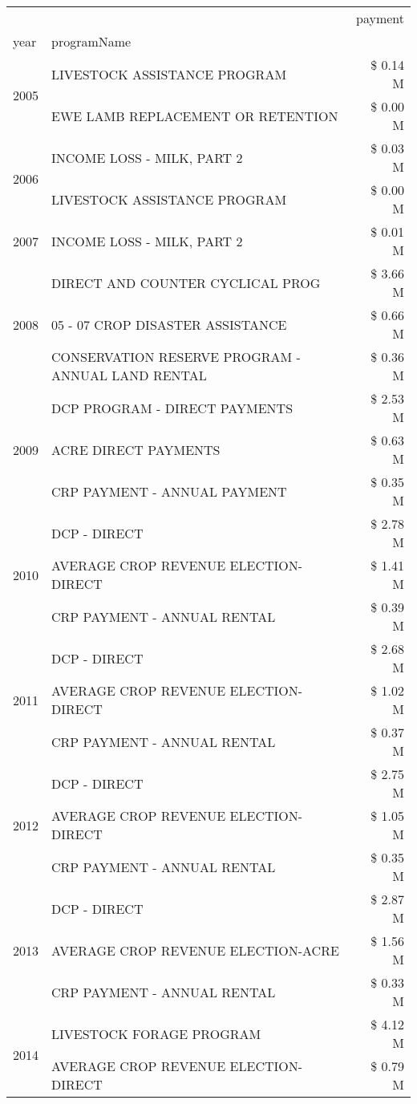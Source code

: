 \begin{tabular}{llr}
\toprule
 &  & payment \\
year & programName &  \\
\midrule
\multirow[t]{2}{*}{2005} & LIVESTOCK ASSISTANCE PROGRAM & \$ 0.14 M \\
 & EWE LAMB REPLACEMENT OR RETENTION & \$ 0.00 M \\
\cline{1-3}
\multirow[t]{2}{*}{2006} & INCOME LOSS - MILK, PART 2 & \$ 0.03 M \\
 & LIVESTOCK ASSISTANCE PROGRAM & \$ 0.00 M \\
\cline{1-3}
2007 & INCOME LOSS - MILK, PART 2 & \$ 0.01 M \\
\cline{1-3}
\multirow[t]{3}{*}{2008} & DIRECT AND COUNTER CYCLICAL PROG & \$ 3.66 M \\
 & 05 - 07 CROP DISASTER ASSISTANCE & \$ 0.66 M \\
 & CONSERVATION RESERVE PROGRAM - ANNUAL LAND RENTAL & \$ 0.36 M \\
\cline{1-3}
\multirow[t]{3}{*}{2009} & DCP PROGRAM - DIRECT PAYMENTS & \$ 2.53 M \\
 & ACRE DIRECT PAYMENTS & \$ 0.63 M \\
 & CRP PAYMENT - ANNUAL PAYMENT & \$ 0.35 M \\
\cline{1-3}
\multirow[t]{3}{*}{2010} & DCP - DIRECT & \$ 2.78 M \\
 & AVERAGE CROP REVENUE ELECTION-DIRECT & \$ 1.41 M \\
 & CRP PAYMENT - ANNUAL RENTAL & \$ 0.39 M \\
\cline{1-3}
\multirow[t]{3}{*}{2011} & DCP - DIRECT & \$ 2.68 M \\
 & AVERAGE CROP REVENUE ELECTION-DIRECT & \$ 1.02 M \\
 & CRP PAYMENT - ANNUAL RENTAL & \$ 0.37 M \\
\cline{1-3}
\multirow[t]{3}{*}{2012} & DCP - DIRECT & \$ 2.75 M \\
 & AVERAGE CROP REVENUE ELECTION-DIRECT & \$ 1.05 M \\
 & CRP PAYMENT - ANNUAL RENTAL & \$ 0.35 M \\
\cline{1-3}
\multirow[t]{3}{*}{2013} & DCP - DIRECT & \$ 2.87 M \\
 & AVERAGE CROP REVENUE ELECTION-ACRE & \$ 1.56 M \\
 & CRP PAYMENT - ANNUAL RENTAL & \$ 0.33 M \\
\cline{1-3}
\multirow[t]{3}{*}{2014} & LIVESTOCK FORAGE PROGRAM & \$ 4.12 M \\
 & AVERAGE CROP REVENUE ELECTION-DIRECT & \$ 0.79 M \\

\end{tabular}
